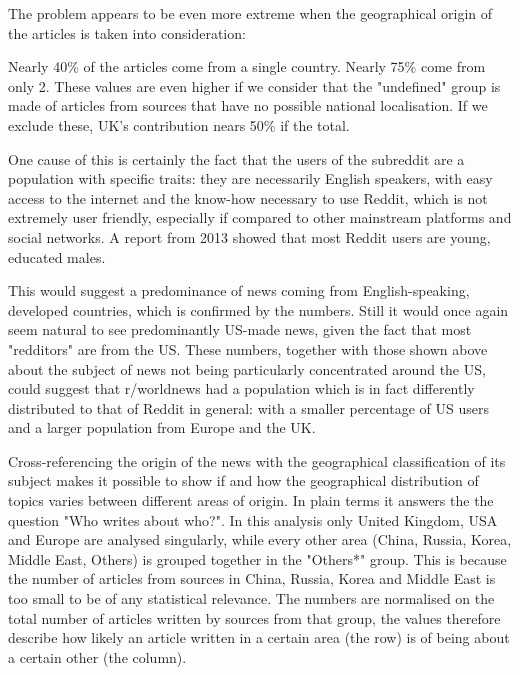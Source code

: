 \documentclass{article}
\begin{document}
The problem appears to be even more extreme when the geographical origin of the articles is taken into consideration:

\bigskip


\bigskip

Nearly 40\% of the articles come from a single country. Nearly 75\% come from only 2. These values are even higher if we consider that the "undefined" group is made of articles from sources that have no possible national localisation. If we exclude these, UK's contribution nears 50\% if the total. 

One cause of this is certainly the fact that the users of the subreddit are a population with specific traits: they are necessarily English speakers, with easy access to the internet and the know-how necessary to use Reddit, which is not extremely user friendly, especially if compared to other mainstream platforms and social networks. A report from 2013\cite{pipreddit} showed that most Reddit users are young, educated males.

This would suggest a predominance of news coming from English-speaking, developed countries, which is confirmed by the numbers. Still it would once again seem natural to see predominantly US-made news, given the fact that most "redditors" are from the US\cite{redditusercountry}. These numbers, together with those shown above about the subject of news not being particularly concentrated around the US, could suggest that r/worldnews had a population which is in fact differently distributed to that of Reddit in general: with a smaller percentage of US users and a larger population from Europe and the UK.

Cross-referencing the origin of the news with the geographical classification of its subject makes it possible to show if and how the geographical distribution of topics varies between different areas of origin. In plain terms it answers the the question "Who writes about who?". In this analysis only United Kingdom, USA and Europe are analysed singularly, while every other area (China, Russia, Korea, Middle East, Others) is grouped together in the "Others*" group. This is because the number of articles from sources in China, Russia, Korea and Middle East is too small to be of any statistical relevance. The numbers are normalised on the total number of articles written by sources from that group, the values therefore describe how likely an article written in a certain area (the row) is of being about a certain other (the column).
\end{document}

